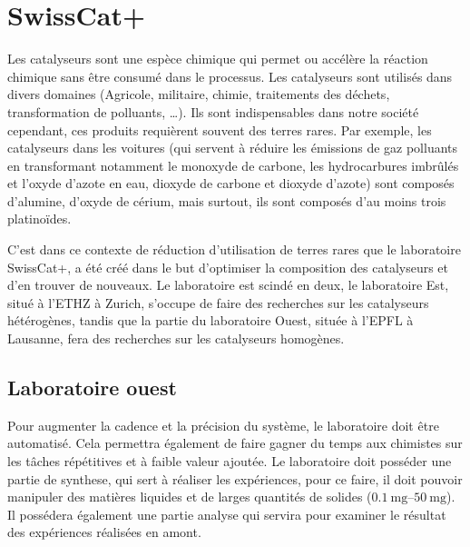 \section{SwissCat+}
Les catalyseurs sont une espèce chimique qui permet ou accélère la réaction chimique sans être consumé dans le processus. Les catalyseurs sont utilisés dans divers domaines (Agricole, militaire, chimie, traitements des déchets, transformation de polluants, \dots). Ils sont indispensables dans notre société cependant, ces produits requièrent souvent des terres rares. Par exemple, les catalyseurs dans les voitures (qui servent à réduire les émissions de gaz polluants en transformant notamment le monoxyde de carbone, les hydrocarbures imbrûlés et l'oxyde d'azote en eau, dioxyde de carbone et dioxyde d'azote) sont composés d'alumine, d'oxyde de cérium, mais surtout, ils sont composés d'au moins trois platinoïdes.

C'est dans ce contexte de réduction d'utilisation de terres rares que le laboratoire SwissCat+, a été créé dans le but d'optimiser la composition des catalyseurs et d'en trouver de nouveaux. Le laboratoire est scindé en deux, le laboratoire Est, situé à l'ETHZ à Zurich, s'occupe de faire des recherches sur les catalyseurs hétérogènes, tandis que la partie du laboratoire Ouest, située à l'EPFL à Lausanne, fera des recherches sur les catalyseurs homogènes.
\subsection{Laboratoire ouest}
Pour augmenter la cadence et la précision du système, le laboratoire doit être automatisé. Cela permettra également de faire gagner du temps aux chimistes sur les tâches répétitives et à faible valeur ajoutée.
Le laboratoire doit posséder une partie de \gls{synthese}, qui sert à réaliser les expériences, pour ce faire, il doit pouvoir manipuler des matières liquides et de larges quantités de solides ($\qtyrange[range-units=single]{0.1}{50}{\mg} $). Il possédera également une partie analyse qui servira pour examiner le résultat des expériences réalisées en amont.

